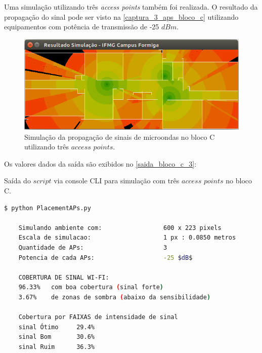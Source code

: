 \documentclass[
	12pt,				%
	twoside,			%
	a4paper,			%
	english,			%
	french,				%
	spanish,			%
	brazil				%
	]{abntex2}
\begin{document}
Uma simulação utilizando três \emph{access points} também foi realizada.
O resultado da propagação do sinal pode ser visto na
\autoref{captura_3_aps_bloco_c} utilizando equipamentos com potência de
transmissão de -25 \(dBm\).

\begin{figure}[ht]
    \caption{\label{captura_3_aps_bloco_c} Simulação da propagação de sinais de microondas no bloco C utilizando três $access$ $points$.    }
    \begin{center}
        \includegraphics[scale=0.7]{imagens/captura-3-aps-bloco-c.png}
    \end{center}
\end{figure}

Os valores dados da saída são exibidos no \autoref{saida_bloco_c_3}:

\begin{quadro}[!htb]
    \caption{\label{saida_bloco_c_3} Saída do $script$ via console CLI para simulação com três $access$ $points$ no bloco C. }

    \begin{lstlisting}[language=bash]
    $ python PlacementAPs.py 

    Simulando ambiente com:                 600 x 223 pixels
    Escala de simulacao:                    1 px : 0.0850 metros
    Quantidade de APs:                      3
    Potencia de cada APs:                   -25 $dB$

    COBERTURA DE SINAL WI-FI:
    96.33%   com boa cobertura (sinal forte)
    3.67%    de zonas de sombra (abaixo da sensibilidade)

    Cobertura por FAIXAS de intensidade de sinal
    sinal Ótimo     29.4%
    sinal Bom       30.6%
    sinal Ruim      36.3%
    \end{lstlisting}

\end{quadro}
\end{document}
